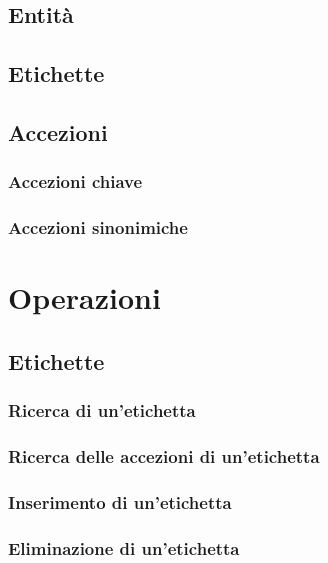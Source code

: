 \documentclass[10pt,a4paper,headinclude,footinclude,hidelinks]{scrreprt} %
\begin{document}
	\section{Entit\`a}
	\section{Etichette}
	\section{Accezioni}
	\subsection{Accezioni chiave}
	\subsection{Accezioni sinonimiche}

	\chapter{Operazioni}
	\label{ch:stage:er:operazioni}

	\section{Etichette}
	\subsection{Ricerca di un'etichetta}
	\subsection{Ricerca delle accezioni di un'etichetta}
	\subsection{Inserimento di un'etichetta}
	\subsection{Eliminazione di un'etichetta}
\end{document}
